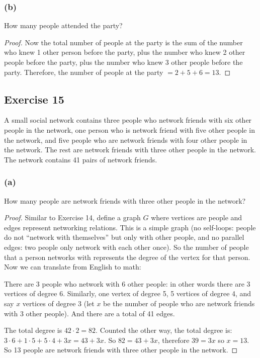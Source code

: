 \documentclass[14pt]{extarticle}
\begin{document}
\subsubsection{(b)}
How many people attended the party?

\begin{proof}
    Now the total number of people at the party is the sum of the number who knew 1 other person before the party, plus the number who knew 2 other people before the party, plus the number who knew 3 other people before the party. Therefore, the number of people at the party $= 2 + 5 + 6 = 13$.
\end{proof}

\subsection{Exercise 15}
A small social network contains three people who network friends with six other people in the network, one person who is network friend with five other people in the network, and five people who are network friends with four other people in the network. The rest are network friends with three other people in the network. The network contains 41 pairs of network friends.

\subsubsection{(a)}
How many people are network friends with three other people in the network?

\begin{proof}
    Similar to Exercise 14, define a graph $G$ where vertices are people and edges represent networking relations. This is a simple graph (no self-loops: people do not ``network with themselves'' but only with other people, and no parallel edges: two people only network with each other once). So the number of people that a person networks with represents the degree of the vertex for that person. Now we can translate from English to math:

    There are 3 people who network with 6 other people: in other words there are 3 vertices of degree 6. Similarly, one vertex of degree 5, 5 vertices of degree 4, and say $x$ vertices of degree 3 (let $x$ be the number of people who are network friends with 3 other people). And there are a total of 41 edges.

    The total degree is $42 \cdot 2 = 82$. Counted the other way, the total degree is: $3 \cdot 6 + 1 \cdot 5 + 5 \cdot 4 + 3x = 43+3x$. So $82 = 43+3x$, therefore $39 = 3x$ so $x = 13$. So 13 people are network friends with three other people in the network.
\end{proof}
\end{document}
